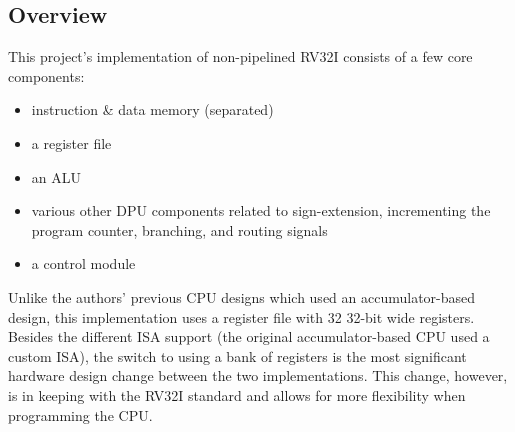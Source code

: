 \documentclass[lettersize,journal]{IEEEtran}
\begin{document}
\subsection{Overview}
This project's implementation of non-pipelined RV32I consists of a few core components:
\begin{itemize}
    \item instruction \& data memory (separated)
    \item a register file
    \item an ALU
    \item various other DPU components related to sign-extension, incrementing the program counter, branching, and routing signals
    \item a control module
\end{itemize}

Unlike the authors' previous CPU designs which used an accumulator-based design, 
this implementation uses a register file with 32 32-bit wide registers.
Besides the different ISA support (the original accumulator-based CPU used a custom ISA),
the switch to using a bank of registers is the most significant hardware design change between the two implementations.
This change, however, is in keeping with the RV32I standard and allows for more flexibility when programming the CPU.
\end{document}

